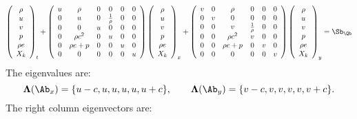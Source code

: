 \begin{equation}
\left(\begin{array}{c}
\rho \\
u \\
v \\
p \\
\rho e \\
X_k
\end{array}\right)_t
+
\left(\begin{array}{cccccc}
u & \rho & 0 & 0 & 0 & 0 \\
0 & u & 0 & \frac{1}{\rho} & 0 & 0 \\
0 & 0 & u & 0 & 0 & 0 \\
0 & \rho c^2 & 0 & u & 0 & 0 \\
0 & \rho e + p & 0 & 0 & u & 0 \\
0 & 0 & 0 & 0 & 0 & u
\end{array}\right)
\left(\begin{array}{c}
\rho \\
u \\
v \\
p \\
\rho e \\
X_k
\end{array}\right)_x
+
\left(\begin{array}{cccccc}
v & 0 & \rho & 0 & 0 & 0 \\
0 & v & 0 & 0 & 0 & 0 \\
0 & 0 & v & \frac{1}{\rho} & 0 & 0 \\
0 & 0 & \rho c^2 & v & 0 & 0 \\
0 & 0 & \rho e + p & 0 & v & 0 \\
0 & 0 & 0 & 0 & 0 & v
\end{array}\right)
\left(\begin{array}{c}
\rho \\
u \\
v \\
p \\
\rho e \\
X_k
\end{array}\right)_y
=
\Sb_\Qb
\end{equation}
The eigenvalues are:
\begin{equation}
{\bf \Lambda}(\Ab_x) = \{u-c,u,u,u,u,u+c\}, \qquad {\bf \Lambda}(\Ab_y) = \{v-c,v,v,v,v,v+c\} .
\end{equation}
The right column eigenvectors are:
